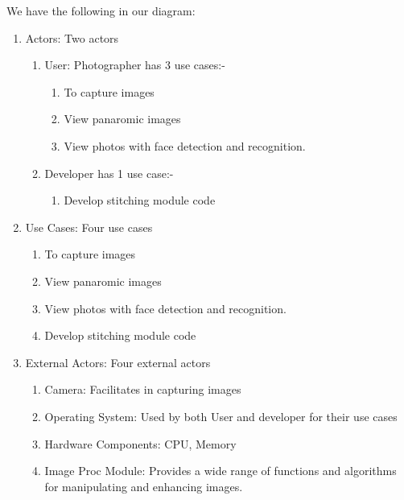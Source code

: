 We have the following in our diagram:
\begin{enumerate}
         \item Actors: Two actors 
         \begin{enumerate}
         \item User: Photographer has 3 use cases:- 
             \begin{enumerate}
             \item To capture images
             \item View panaromic images
             \item View photos with face detection and recognition.
             \end{enumerate}
         \item Developer has 1 use case:- 
             \begin{enumerate}
             \item Develop stitching module code
             \end{enumerate}
\end{enumerate}
         \item Use Cases: Four use cases 
         \begin{enumerate}
             \item To capture images
             \item View panaromic images
             \item View photos with face detection and recognition.
             \item Develop stitching module code
         \end{enumerate}

         \item External Actors: Four external actors
         \begin{enumerate}
             \item Camera: Facilitates in capturing images 
             \item Operating System: Used by both User and developer for their use cases 
             \item Hardware Components: CPU, Memory  
             \item Image Proc Module: Provides a wide range of functions and algorithms for manipulating and enhancing images.
         \end{enumerate}
         
\end{enumerate}


